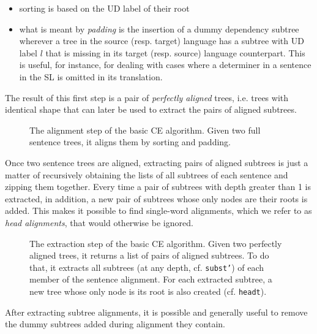 \begin{itemize}
 \item sorting is based on the UD label of their root 
 \item what is meant by \textit{padding} is the insertion of a dummy dependency subtree wherever a tree in the source (resp. target) language has a subtree with UD label $l$ that is missing in its target (resp. source) language counterpart. This is useful, for instance, for dealing with cases where a determiner in a sentence in the SL is omitted in its translation.\smallskip
\end{itemize} \smallskip

The result of this first step is a pair of \textit{perfectly aligned} trees, i.e. trees with identical shape that can later be used to extract the pairs of aligned subtrees. 

\begin{figure}[H]
 \centering
 
 \caption[The alignment step of the basic CE algorithm]{The alignment step of the basic CE algorithm. Given two full sentence trees, it aligns them by sorting and padding.}
 \label{basea}
\end{figure}

Once two sentence trees are aligned, extracting pairs of aligned subtrees is just a matter of recursively obtaining the lists of all subtrees of each sentence and zipping them together. Every time a pair of subtrees with depth greater than 1 is extracted, in addition, a new pair of subtrees whose only nodes are their roots is added. This makes it possible to find single-word alignments, which we refer to as \textit{head alignments}, that would otherwise be ignored. 

\begin{figure}[H]
 \centering
 
 \caption[The extraction step of the basic CE algorithm]{The extraction step of the basic CE algorithm. Given two perfectly aligned trees, it returns a list of pairs of aligned subtrees. To do that, it extracts all subtrees (at any depth, cf. \texttt{subst'}) of each member of the sentence alignment. For each extracted subtree, a new tree whose only node is its root is also created (cf. \texttt{headt}).}
 \label{baseb}
\end{figure}

After extracting subtree alignments, it is possible and generally useful to remove the dummy subtrees added during alignment they contain.

